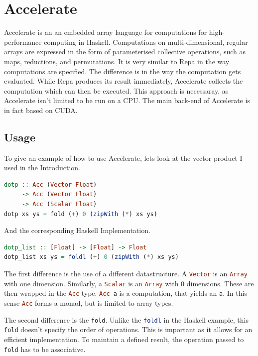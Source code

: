 \documentclass[a4paper,bibliography=totocnumbered,parskip,headsepline]{scrbook}
\begin{document}
\section{Accelerate}
Accelerate\cite{chakravarty2011accelerating,mcdonelloptimising} is an an embedded array language for computations for high-performance computing in Haskell.
Computations on multi-dimensional, regular arrays are expressed in the form of parameterised collective operations, such as maps, reductions, and permutations.
It is very similar to Repa\cite{keller2010regular} in the way computations are specified.
The difference is in the way the computation gets evaluated.
While Repa produces its result immediately, Accelerate collects the computation which can then be executed.
This approach is necessaray, as Accelerate isn't limited to be run on a CPU.
The main back-end of Accelerate is in fact based on CUDA.

\subsection{Usage}
To give an example of how to use Accelerate, lets look at the vector product I used in the Introduction.

\begin{lstlisting}[language=haskell]
dotp :: Acc (Vector Float)
     -> Acc (Vector Float)
     -> Acc (Scalar Float)
dotp xs ys = fold (+) 0 (zipWith (*) xs ys)
\end{lstlisting}

And the corresponding Haskell Implementation.

\begin{lstlisting}[language=haskell]
dotp_list :: [Float] -> [Float] -> Float
dotp_list xs ys = foldl (+) 0 (zipWith (*) xs ys)
\end{lstlisting}

The first difference is the use of a different datastructure.
A \lstinline[language=haskell]!Vector! is an \lstinline[language=haskell]!Array! with one dimension.
Similarly, a \lstinline[language=haskell]!Scalar! is an \lstinline[language=haskell]!Array! with 0 dimensions.
These are then wrapped in the \lstinline[language=haskell]!Acc! type.
\lstinline[language=haskell]!Acc a! is a computation, that yields an \lstinline[language=haskell]!a!.
In this sense \lstinline[language=haskell]!Acc! forms a monad, but is limited to array types.

The second difference is the \lstinline[language=haskell]!fold!.
Unlike the \lstinline[language=haskell]!foldl! in the Haskell example, this \lstinline[language=haskell]!fold! doesn't specify the order of operations.
This is important as it allows for an efficient implementation.
To maintain a defined result, the operation passed to \lstinline[language=haskell]!fold! has to be associative.
\end{document}
